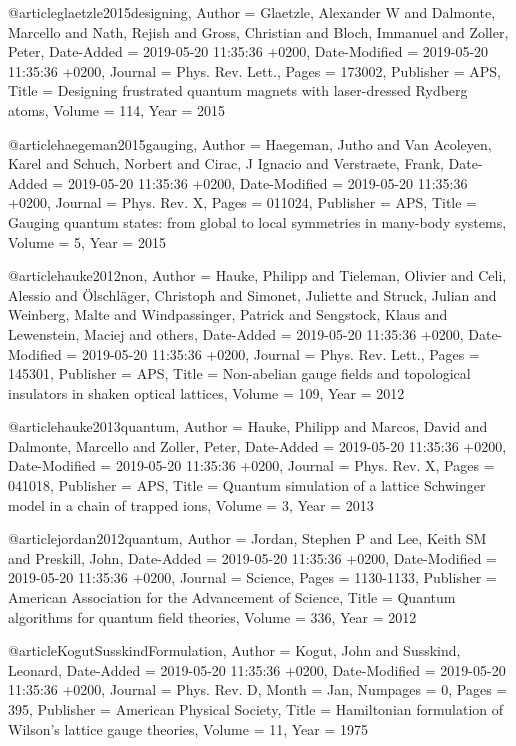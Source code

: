 \documentclass[epj,final]{svjour}
\begin{document}
@article{glaetzle2015designing,
	Author = {Glaetzle, Alexander W and Dalmonte, Marcello and Nath, Rejish and Gross, Christian and Bloch, Immanuel and Zoller, Peter},
	Date-Added = {2019-05-20 11:35:36 +0200},
	Date-Modified = {2019-05-20 11:35:36 +0200},
	Journal = {Phys. Rev. Lett.},
	Pages = {173002},
	Publisher = {APS},
	Title = {Designing frustrated quantum magnets with laser-dressed Rydberg atoms},
	Volume = {114},
	Year = {2015}}

@article{haegeman2015gauging,
	Author = {Haegeman, Jutho and Van Acoleyen, Karel and Schuch, Norbert and Cirac, J Ignacio and Verstraete, Frank},
	Date-Added = {2019-05-20 11:35:36 +0200},
	Date-Modified = {2019-05-20 11:35:36 +0200},
	Journal = {Phys. Rev. X},
	Pages = {011024},
	Publisher = {APS},
	Title = {Gauging quantum states: from global to local symmetries in many-body systems},
	Volume = {5},
	Year = {2015}}

@article{hauke2012non,
	Author = {Hauke, Philipp and Tieleman, Olivier and Celi, Alessio and {\"O}lschl{\"a}ger, Christoph and Simonet, Juliette and Struck, Julian and Weinberg, Malte and Windpassinger, Patrick and Sengstock, Klaus and Lewenstein, Maciej and others},
	Date-Added = {2019-05-20 11:35:36 +0200},
	Date-Modified = {2019-05-20 11:35:36 +0200},
	Journal = {Phys. Rev. Lett.},
	Pages = {145301},
	Publisher = {APS},
	Title = {Non-abelian gauge fields and topological insulators in shaken optical lattices},
	Volume = {109},
	Year = {2012}}

@article{hauke2013quantum,
	Author = {Hauke, Philipp and Marcos, David and Dalmonte, Marcello and Zoller, Peter},
	Date-Added = {2019-05-20 11:35:36 +0200},
	Date-Modified = {2019-05-20 11:35:36 +0200},
	Journal = {Phys. Rev. X},
	Pages = {041018},
	Publisher = {APS},
	Title = {Quantum simulation of a lattice {Schwinger} model in a chain of trapped ions},
	Volume = {3},
	Year = {2013}}

@article{jordan2012quantum,
	Author = {Jordan, Stephen P and Lee, Keith SM and Preskill, John},
	Date-Added = {2019-05-20 11:35:36 +0200},
	Date-Modified = {2019-05-20 11:35:36 +0200},
	Journal = {Science},
	Pages = {1130-1133},
	Publisher = {American Association for the Advancement of Science},
	Title = {Quantum algorithms for quantum field theories},
	Volume = {336},
	Year = {2012}}

@article{KogutSusskindFormulation,
	Author = {Kogut, John and Susskind, Leonard},
	Date-Added = {2019-05-20 11:35:36 +0200},
	Date-Modified = {2019-05-20 11:35:36 +0200},
	Journal = {Phys. Rev. D},
	Month = {Jan},
	Numpages = {0},
	Pages = {395},
	Publisher = {American Physical Society},
	Title = {{Hamiltonian formulation of Wilson's lattice gauge theories}},
	Volume = {11},
	Year = {1975}}
\end{document}
